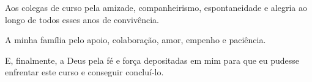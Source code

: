 \begin{agradecimentos}
Aos colegas de curso pela amizade, companheirismo, espontaneidade e alegria ao longo de todos esses anos de convivência.

A minha família pelo apoio, colaboração, amor, empenho e paciência. 

E, finalmente, a Deus pela fé e força depositadas em mim para que eu pudesse enfrentar este curso e conseguir concluí-lo.


\end{agradecimentos}
